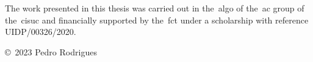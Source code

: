 \begin{funding}
  The work presented in this thesis was carried out in the~\acrlong{algo} of
  the~\acrlong{ac} group of the~\acrlong{cisuc} and financially supported by
  the~\acrlong{fct} under a scholarship with reference UIDP/00326/2020.

  \copyright{}~2023 Pedro Rodrigues
\end{funding}